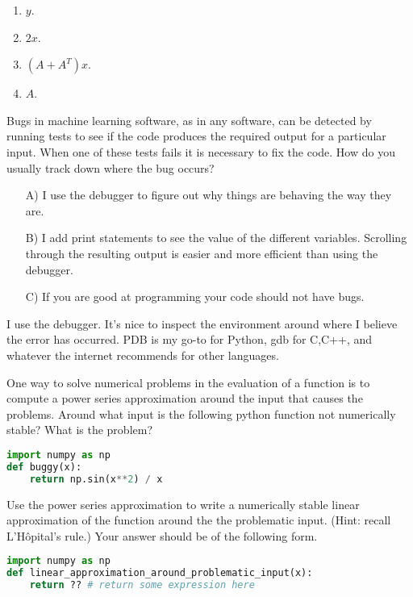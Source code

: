 \documentclass[submit]{harvardml}
\begin{document}
\begin{enumerate}[label=(\alph*)]
\item $y$.
\item $2x$.
\item $(A + A^T)x$.
\item $A$.
\end{enumerate}


\begin{problem}
Bugs in machine learning software, as in any software, can be detected by running
tests to see if the code produces the required output for a particular input.
When one of these tests fails it is necessary to fix the code.  How do you usually track down where
the bug occurs?
\begin{itemize}
\item[A)] I use the debugger to figure out why things are behaving the way they are.
\item[B)] I add print statements to see the value of the different variables.
Scrolling through the resulting output is easier and more efficient than using the debugger.
\item[C)] If you are good at programming your code should not have bugs.
\end{itemize}
I use the debugger. It's nice to inspect the environment around where I believe the error has occurred. PDB is my go-to for Python, gdb for C,C++, and whatever the internet recommends for other languages.
\end{problem}


\begin{problem}[Stability]
One way to solve numerical problems in the evaluation of a function is to compute
a power series approximation around the input that causes the problems.
Around what input is the following python function not numerically stable?
What is the problem?

\begin{lstlisting}[language=python]
import numpy as np
def buggy(x):
    return np.sin(x**2) / x
\end{lstlisting}
Use the power series approximation to write a numerically stable linear approximation of the function around the the problematic input. (Hint: recall L'H\^opital's rule.) Your answer should be of the following form.

\begin{lstlisting}[language=python]
import numpy as np
def linear_approximation_around_problematic_input(x):
    return ?? # return some expression here
\end{lstlisting}
\end{problem}
\end{document}
